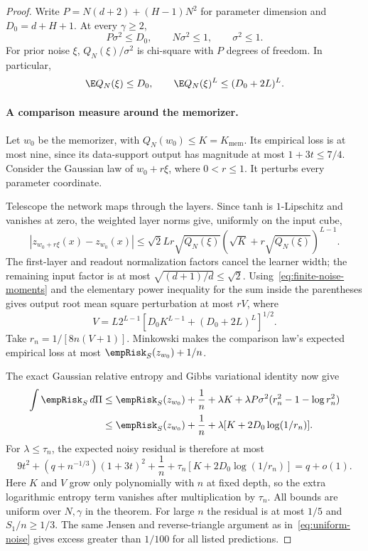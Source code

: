 \begin{proof}
Write $P=N(d+2)+(H-1)N^2$ for parameter dimension and $D_0=d+H+1$. At every $\gamma\ge2$,
\[
 P\sigma^2\le D_0,\qquad N\sigma^2\le1,\qquad\sigma^2\le1.
\]
For prior noise $\xi$, $Q_N(\xi)/\sigma^2$ is chi-square with $P$ degrees of freedom. In particular,
\begin{equation}
 \E Q_N(\xi)\le D_0,\qquad
 \E Q_N(\xi)^L\le(D_0+2L)^L.
 \label{eq:finite-noise-moments}
\end{equation}

\paragraph{A comparison measure around the memorizer.}
Let $w_0$ be the memorizer, with $Q_N(w_0)\le K=K_{\mathrm{mem}}$. Its empirical loss is at most nine, since its data-support output has magnitude at most $1+3t\le7/4$. Consider the Gaussian law of $w_0+r\xi$, where $0<r\le1$. It perturbs every parameter coordinate.

Telescope the network maps through the layers. Since tanh is $1$-Lipschitz and vanishes at zero, the weighted layer norms give, uniformly on the input cube,
\[
 |z_{w_0+r\xi}(x)-z_{w_0}(x)|
 \le\sqrt2 Lr\sqrt{Q_N(\xi)}
               (\sqrt K+r\sqrt{Q_N(\xi)})^{L-1}.
\]
The first-layer and readout normalization factors cancel the learner width; the remaining input factor is at most $\sqrt{(d+1)/d}\le\sqrt2$. Using~\eqref{eq:finite-noise-moments} and the elementary power inequality for the sum inside the parentheses gives output root mean square perturbation at most $rV$, where
\[
 V=L2^{L-1}\left[D_0K^{L-1}+(D_0+2L)^L\right]^{1/2}.
\]
Take $r_n=1/[8n(V+1)]$. Minkowski makes the comparison law's expected empirical loss at most $\empRisk_S(z_{w_0})+1/n$.

The exact Gaussian relative entropy and Gibbs variational identity now give
\begin{align*}
 \int\empRisk_S\,d\Pi
 &\le\empRisk_S(z_{w_0})+\frac1n
       +\lambda K+\lambda P\sigma^2(r_n^2-1-\log r_n^2)\\
 &\le\empRisk_S(z_{w_0})+\frac1n
       +\lambda[K+2D_0\log(1/r_n)].
\end{align*}
For $\lambda\le\tau_n$, the expected noisy residual is therefore at most
\[
 9t^2+(q+n^{-1/3})(1+3t)^2+\frac1n
       +\tau_n[K+2D_0\log(1/r_n)]=q+o(1).
\]
Here $K$ and $V$ grow only polynomially with $n$ at fixed depth, so the extra logarithmic entropy term vanishes after multiplication by $\tau_n$. All bounds are uniform over $N,\gamma$ in the theorem. For large $n$ the residual is at most $1/5$ and $S_1/n\ge1/3$. The same Jensen and reverse-triangle argument as in~\eqref{eq:uniform-noise} gives excess greater than $1/100$ for all listed predictions.


\end{proof}
